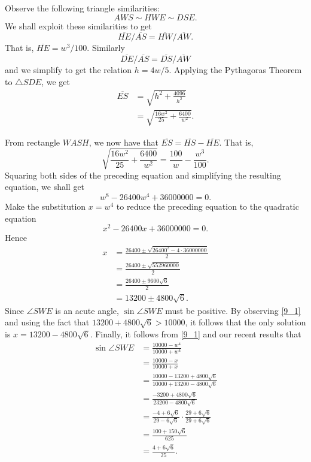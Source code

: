 \documentclass[9pt]{article}
\begin{document}
\begin{enumerate}
      Observe the following triangle similarities:
      $$AWS \sim HWE \sim DSE.$$
      We shall exploit these similarities to get
      $$\overline{HE}/\overline{AS} = \overline{HW}/\overline{AW}.$$
      That is, $\overline{HE} = w^3/100$. Similarly
      $$\overline{DE}/\overline{AS} = \overline{DS}/\overline{AW}$$
      and we simplify to get the relation $h = 4w/5$. Applying the Pythagoras
      Theorem to $\triangle SDE$, we get
      \begin{align*}
         \overline{ES} &= \sqrt{h^2 + \frac{4096}{h^2}} \\
            &= \sqrt{\frac{16w^2}{25} + \frac{6400}{w^2}}.
      \end{align*}

      From rectangle $WASH$, we now have that
      $\overline{ES} = \overline{HS} - \overline{HE}$. That is,
      $$\sqrt{\frac{16w^2}{25} + \frac{6400}{w^2}} = \frac{100}{w} -
         \frac{w^3}{100}.$$
      Squaring both sides of the preceding equation and simplifying the
      resulting equation, we shall get
      $$w^8 - 26400w^4 + 36000000 = 0.$$
      Make the substitution $x = w^4$ to reduce the preceding equation to the
      quadratic equation
      $$x^2 - 26400x + 36000000 = 0.$$
      Hence
      \begin{align*}
         x &= \frac{26400 \pm \sqrt{26400^2 - 4 \cdot 36000000}}{2} \\
           &= \frac{26400 \pm \sqrt{552960000}}{2} \\
           &= \frac{26400 \pm 9600\sqrt{6}}{2} \\
           &= 13200 \pm 4800 \sqrt{6}.
      \end{align*}
      Since $\angle SWE$ is an acute angle, $\sin \angle SWE$ must be positive.
      By observing \eqref{9_1} and using the fact that
      $13200 + 4800\sqrt{6} > 10000$, it follows that the only solution is
      $x = 13200 - 4800 \sqrt{6}$. Finally, it follows from \eqref{9_1} and our
      recent results that 
      \begin{align*}
         \sin \angle SWE &= \frac{10000 - w^4}{10000 + w^4} \\
            &= \frac{10000 - x}{10000 + x} \\
            &= \frac{10000 - 13200 + 4800\sqrt{6}}
               {10000 + 13200 - 4800\sqrt{6}} \\
            &= \frac{-3200 + 4800\sqrt{6}}{23200 - 4800\sqrt{6}} \\
            &= \frac{-4 + 6\sqrt{6}}{29 - 6\sqrt{6}} \cdot
               \frac{29 + 6\sqrt{6}}{29 + 6\sqrt{6}} \\
            &= \frac{100 + 150\sqrt{6}}{625} \\
            &= \frac{4 + 6\sqrt{6}}{25}.
      \end{align*}

\end{enumerate}
\end{document}

